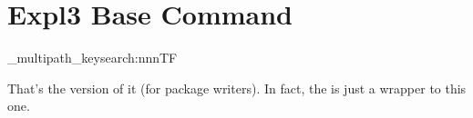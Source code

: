 \documentclass[10pt]{article}
\begin{document}

\section{Expl3 Base Command}
\begin{codedescribe}{\pgfkeysearch_multipath_keysearch:nnnTF}
\begin{codesyntax}%
\end{codesyntax}
That's the  version of it (for package writers). In fact, the \tsobj{\pgfkeysearchvalueof} is just a wrapper to this one.
\end{codedescribe}
\end{document}
